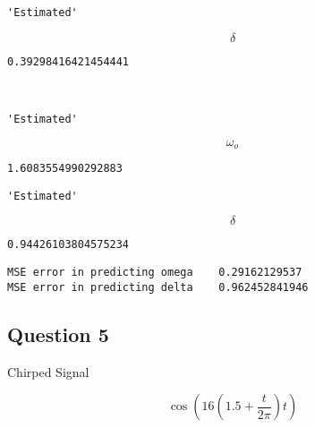 \documentclass[11pt]{article}
\begin{document}
    
    
    \begin{verbatim}
'Estimated'
    \end{verbatim}

    
    $$\delta$$

    
    
    \begin{verbatim}
0.39298416421454441
    \end{verbatim}

    
    \begin{center}
    \end{center}
    { \hspace*{\fill} \\}
    
    
    \begin{verbatim}
'Estimated'
    \end{verbatim}

    
    $$ \omega_o $$

    
    
    \begin{verbatim}
1.6083554990292883
    \end{verbatim}

    
    
    \begin{verbatim}
'Estimated'
    \end{verbatim}

    
    $$\delta$$

    
    
    \begin{verbatim}
0.94426103804575234
    \end{verbatim}

    
    \begin{Verbatim}[commandchars=\\\{\}]
MSE error in predicting omega 	 0.29162129537
MSE error in predicting delta 	 0.962452841946

    \end{Verbatim}

    \subsection{Question 5}\label{question-5}

Chirped Signal

\[ \cos(16( 1.5+ \frac{t}{2\pi})t)  \]
\end{document}
